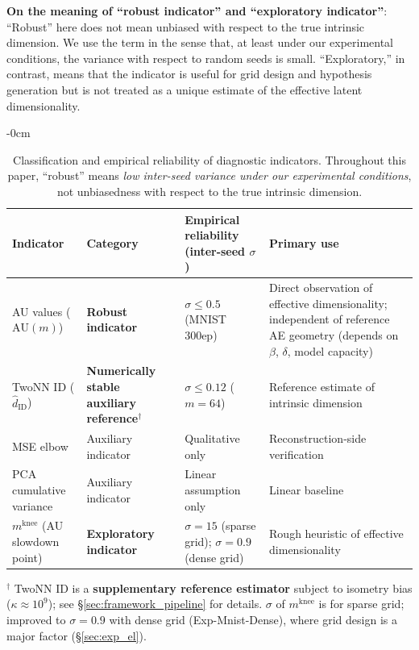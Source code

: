 \documentclass[make,article,submit,pdftex,moreauthors]{Definitions/mdpi}
\newcommand{\kap}{\kappa}
\newcommand{\mknee}{m^{\mathrm{knee}}}
\begin{document}
\textbf{On the meaning of ``robust indicator'' and ``exploratory indicator''}:
``Robust'' here does not mean unbiased with respect to the true intrinsic dimension.
We use the term in the sense that, at least under our experimental conditions,
the variance with respect to random seeds is small.
``Exploratory,'' in contrast, means that the indicator is useful for grid design
and hypothesis generation but is not treated as a unique estimate of the
effective latent dimensionality.

\begin{table}[H]
\begin{adjustwidth}{-\extralength}{0cm}
\centering
\caption{Classification and empirical reliability of diagnostic indicators. Throughout this paper, ``robust'' means \textit{low inter-seed variance under our experimental conditions}, not unbiasedness with respect to the true intrinsic dimension.}
\label{tab:indicator_class}
\small
\begin{tabular}{p{3.2cm}p{3.0cm}p{3.8cm}p{3.8cm}}
\toprule
Indicator & Category & Empirical reliability (inter-seed $\sigma$) & Primary use \\
\midrule
AU values ($\mathrm{AU}(m)$) & \textbf{Robust indicator} & $\sigma \leq 0.5$ (MNIST 300ep) & Direct observation of effective dimensionality; independent of reference AE geometry (depends on $\beta$, $\delta$, model capacity) \\
TwoNN ID ($\hat{d}_\mathrm{ID}$) & \textbf{Numerically stable auxiliary reference}$^\dagger$ & $\sigma \leq 0.12$ ($m=64$) & Reference estimate of intrinsic dimension \\
MSE elbow & Auxiliary indicator & Qualitative only & Reconstruction-side verification \\
PCA cumulative variance & Auxiliary indicator & Linear assumption only & Linear baseline \\
$\mknee$ (AU slowdown point) & \textbf{Exploratory indicator} & $\sigma=15$ (sparse grid); $\sigma=0.9$ (dense grid) & Rough heuristic of effective dimensionality \\
\bottomrule
\end{tabular}
\par\medskip
\footnotesize
$^\dagger$ TwoNN ID is a \textbf{supplementary reference estimator} subject to isometry bias ($\kap \approx 10^9$); see §\ref{sec:framework_pipeline} for details.
$\sigma$ of $\mknee$ is for sparse grid; improved to $\sigma=0.9$ with dense grid (Exp-Mnist-Dense), where grid design is a major factor (§\ref{sec:exp_el}).
\normalsize
\end{adjustwidth}
\end{table}
\end{document}
